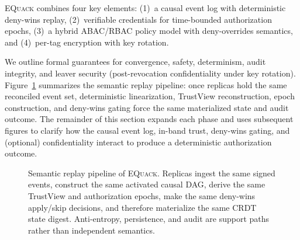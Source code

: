 \documentclass[10pt,journal,compsoc]{IEEEtran}
\newcommand{\equack}{\textsc{EQuack}}
\begin{document}
\equack{} combines four key elements: (1)~a causal event log with deterministic deny-wins replay, (2)~verifiable credentials for time-bounded authorization epochs, (3)~a hybrid ABAC/RBAC policy model with deny-overrides semantics, and (4)~per-tag encryption with key rotation.

We outline formal guarantees for convergence, safety, determinism, audit integrity, and leaver security (post-revocation confidentiality under key rotation). Figure~\ref{fig:ecac-overview-paperC} summarizes the semantic replay pipeline: once replicas hold the same reconciled event set, deterministic linearization, TrustView reconstruction, epoch construction, and deny-wins gating force the same materialized state and audit outcome. The remainder of this section expands each phase and uses subsequent figures to clarify how the causal event log, in-band trust, deny-wins gating, and (optional) confidentiality interact to produce a deterministic authorization outcome.

\begin{figure}[t]
  \centering
  \caption{Semantic replay pipeline of \equack{}. Replicas ingest the same signed events, construct the same activated causal DAG, derive the same TrustView and authorization epochs, make the same deny-wins apply/skip decisions, and therefore materialize the same CRDT state digest. Anti-entropy, persistence, and audit are support paths rather than independent semantics.}
  \label{fig:ecac-overview-paperC}
\end{figure}

\end{document}
